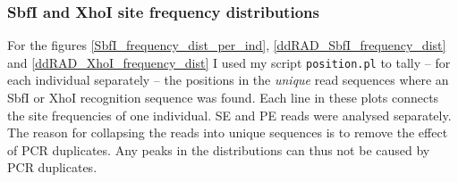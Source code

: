\documentclass[a4paper,12pt,times,print,index,custombib,custommargin]{PhDThesisPSnPDF}\usepackage[]{graphicx}\usepackage[]{color}
\begin{document}
\subsubsection{SbfI and XhoI site frequency distributions}\label{site_frequency_distributions}

For the figures \ref{SbfI_frequency_dist_per_ind}, \ref{ddRAD_SbfI_frequency_dist} and \ref{ddRAD_XhoI_frequency_dist} I used my script \texttt{position.pl} to tally -- for each individual separately -- the positions in the \emph{unique} read sequences where an SbfI or XhoI recognition sequence was found. Each line in these plots connects the site frequencies of one individual. SE and PE reads were analysed separately. The reason for collapsing the reads into unique sequences is to remove the effect of PCR duplicates. Any peaks in the distributions can thus not be caused by PCR duplicates.
\end{document}
